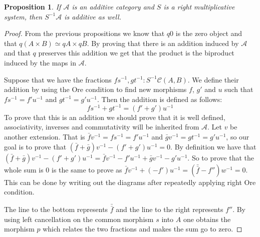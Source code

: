 \documentclass[11pt]{article}
\newtheorem{prop}[theorem]{Proposition}
\theoremstyle{definition}
\theoremstyle{remark}
\begin{document}
            \begin{prop}
                If $\mathcal{A}$ is an additive category and $S$ is a right multiplicative system, then $S^{-1}\mathcal{A}$ is additive as well.
            \end{prop}

            \begin{proof}
                From the previous propositions we know that $q0$ is the zero object and that $q(A\times B)\simeq qA\times qB$. By proving that there is an addition induced by $\mathcal{A}$ and that $q$ preserves this addition we get that the product is the biproduct induced by the maps in $\mathcal{A}$.

                Suppose that we have the fractions $fs^{-1}, gt^{-1}:S^{-1}\mathcal{C}(A,B)$. We define their addition by using the Ore condition  to find new morphisms $f$, $g'$ and $u$ such that $fs^{-1} = f'u^{-1}$ and $gt^{-1} = g'u^{-1}$. Then the addition is defined as follows:
                \begin{equation*}
                    fs^{-1}+gt^{-1} = (f'+g')u^{-1}
                \end{equation*}
                To prove that this is an addition we should prove that it is well defined, associativity, inverses and commutativity will be inherited from $\mathcal{A}$.
                Let $v$ be another extension. That is $\bar{f}v^{-1}=fs^{-1}=f'u^{-1}$ and $\bar{g}v^{-1}=gt^{-1}=g'u^{-1}$, so our goal is to prove that $(\bar{f}+\bar{g})v^{-1}-(f'+g')u^{-1}=0$. By definition we have that $(\bar{f}+\bar{g})v^{-1}-(f'+g')u^{-1}=\bar{f}v^{-1}-f'u^{-1}+\bar{g}v^{-1}-g'u^{-1}$. So to prove that the whole sum is $0$ is the same to prove as $\bar{f}v^{-1}+(-f')u^{-1}=(\bar{\bar{f}}-f'')w^{-1}=0$. This can be done by writing out the diagrams after repeatedly applying right Ore condition.
                \begin{center}
                \end{center}
                The line to the bottom represents $\bar{\bar{f}}$ and the line to the right represents $f''$. By using left cancellation on the common morphism $s$ into $A$ one obtains the morphism $p$ which relates the two fractions and makes the sum go to zero.


\end{proof}
\end{document}
